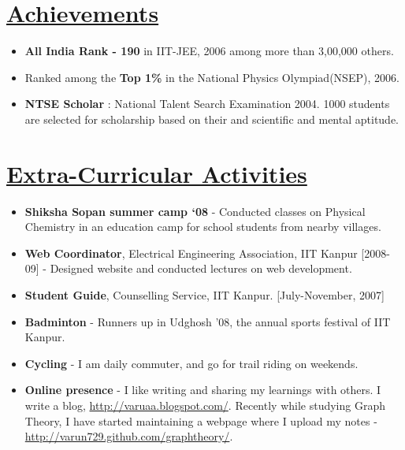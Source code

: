 \documentclass[10pt]{article}
\newcommand{\sectionhead}[1]{%
\section*{\underline{#1}}
}
\begin{document}
%
%
\sectionhead{Achievements}
\begin{itemize}
\item {\bf All India Rank - 190} in IIT-JEE, 2006 among more than 3,00,000 others.
\item Ranked among the {\bf Top 1\%} in the National Physics Olympiad(NSEP), 2006.
\item {\bf NTSE Scholar} : National Talent Search Examination 2004. 1000 students are selected for scholarship based on their and scientific and mental aptitude.
\end{itemize}


%
%
\sectionhead{Extra-Curricular Activities}
\begin{itemize}
	\item \textbf{Shiksha Sopan summer camp `08} - Conducted classes on Physical Chemistry in an education camp for school students from nearby villages.
	\item \textbf{Web Coordinator}, Electrical Engineering Association, IIT Kanpur [2008-09] - Designed website and  conducted lectures on web development.
	\item \textbf{Student Guide}, Counselling Service, IIT Kanpur. [July-November, 2007]
	\item \textbf{Badminton} - Runners up in Udghosh '08, the annual sports festival of IIT Kanpur. 
	\item \textbf{Cycling} - I am daily commuter, and go for trail riding on weekends.
	\item \textbf{Online presence} - I like writing and sharing my learnings with others. I write a blog, \url{http://varuaa.blogspot.com/}. Recently while studying Graph Theory, I have started maintaining a webpage where I upload my notes - \url{http://varun729.github.com/graphtheory/}.
\end{itemize}


%
%


%
%
\end{document}
